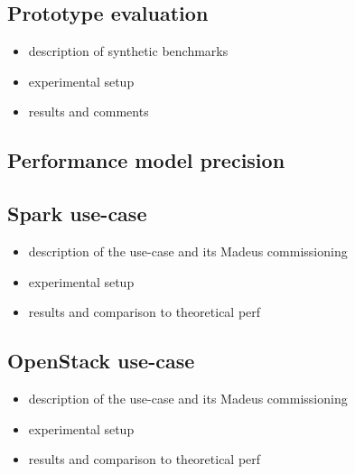 
\subsection{Prototype evaluation}

\begin{itemize}
\item description of synthetic benchmarks
\item experimental setup
\item results and comments
\end{itemize}

\subsection{Performance model precision}


\subsection{Spark use-case}

\begin{itemize}
\item description of the use-case and its Madeus commissioning
\item experimental setup
\item results and comparison to theoretical perf
\end{itemize}

\subsection{OpenStack use-case}

\begin{itemize}
\item description of the use-case and its Madeus commissioning
\item experimental setup
\item results and comparison to theoretical perf
\end{itemize}